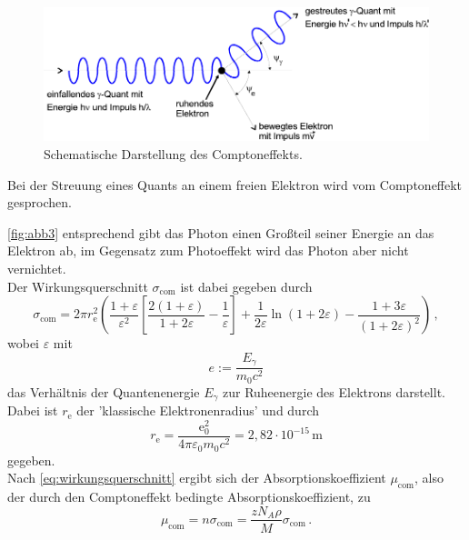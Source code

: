 \begin{figure}[H]
    \centering
    \includegraphics{figures/abb3.pdf}
    \caption{Schematische Darstellung des Comptoneffekts\cite{ap04}.}
    \label{fig:abb3}
\end{figure}

Bei der Streuung eines Quants an einem freien Elektron wird vom
Comptoneffekt gesprochen.


\autoref{fig:abb3} entsprechend gibt das Photon einen Großteil
seiner Energie an das Elektron ab, im Gegensatz zum Photoeffekt
wird das Photon aber nicht vernichtet. \\

Der Wirkungsquerschnitt $\sigma_{\mathrm{com}}$ ist dabei gegeben durch
\begin{equation}
    \sigma_{\mathrm{com}} = 2 \pi r^2_\mathrm{e} 
    \left(\frac{1 + \varepsilon}{\varepsilon^2} 
    \left[\frac{2(1 + \varepsilon)}{1 + 2 \varepsilon} -\frac{1}{\varepsilon}\right]
    + \frac{1}{2 \varepsilon} \ln(1 + 2 \varepsilon) 
    - \frac{1 + 3 \varepsilon}{(1 + 2 \varepsilon)^2}\right) \,,
    \label{eq:wirkungsquercompton}
\end{equation}
wobei $\varepsilon$ mit
\begin{equation*}
    e := \frac{E_\gamma}{m_0 c^2}
\end{equation*}
das Verhältnis der Quantenenergie $E_\gamma$ zur Ruheenergie 
des Elektrons darstellt.
Dabei ist $r_\text{e}$ der 'klassische Elektronenradius' und durch
\begin{equation*}
    r_\text{e} = \frac{\text{e}_0^2}
    {4 \pi \varepsilon_0 m_0 c^2} = 2,82 \cdot 10^{-15} \,\unit{\meter}
\end{equation*}
gegeben. \\

Nach \eqref{eq:wirkungsquerschnitt} ergibt sich der Absorptionskoeffizient
$\mu_{\text{com}}$, also der durch den Comptoneffekt bedingte
Absorptionskoeffizient, zu
\begin{equation}
    \mu_{\text{com}} = n \sigma_{\text{com}} =  
    \frac{z N_A \rho}{M} \sigma_{\text{com}} \,.
    \label{eq:absorptionskoefftheorie}
\end{equation} 

